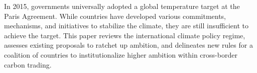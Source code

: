 \documentclass[12pt,english]{article}
\begin{document}

In 2015, governments universally adopted a global temperature target at the Paris Agreement. While countries have developed various commitments, mechanisms, and initiatives to stabilize the climate, they are still insufficient to achieve the target. This paper reviews the international climate policy regime, assesses existing proposals to ratchet up ambition, and delineates new rules for a coalition of countries to institutionalize higher ambition within cross-border carbon trading.
\end{document}
